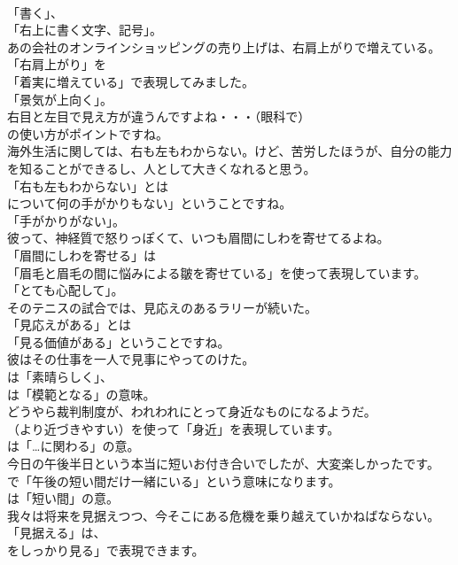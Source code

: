 \documentclass[8pt]{extreport}
\begin{document}
\begin{CJK}{UTF8}{min}
\\	「書く」、
\\	「右上に書く文字、記号」。	
\\	あの会社のオンラインショッピングの売り上げは、右肩上がりで増えている。 
\\	「右肩上がり」を
\\	「着実に増えている」で表現してみました。
\\	「景気が上向く」。	
\\	右目と左目で見え方が違うんですよね・・・（眼科で） 
\\	の使い方がポイントですね。	
\\	海外生活に関しては、右も左もわからない。けど、苦労したほうが、自分の能力を知ることができるし、人として大きくなれると思う。 
\\	「右も左もわからない」とは
\\	について何の手がかりもない」ということですね。
\\	「手がかりがない」。	
\\	彼って、神経質で怒りっぽくて、いつも眉間にしわを寄せてるよね。 
\\	「眉間にしわを寄せる」は
\\	「眉毛と眉毛の間に悩みによる皺を寄せている」を使って表現しています。
\\	「とても心配して」。	
\\	そのテニスの試合では、見応えのあるラリーが続いた。 
\\	「見応えがある」とは
\\	「見る価値がある」ということですね。	
\\	彼はその仕事を一人で見事にやってのけた。 
\\	は「素晴らしく」、
\\	は「模範となる」の意味。	
\\	どうやら裁判制度が、われわれにとって身近なものになるようだ。 
\\	（より近づきやすい）を使って「身近」を表現しています。
\\	は「…に関わる」の意。	
\\	今日の午後半日という本当に短いお付き合いでしたが、大変楽しかったです。 
\\	で「午後の短い間だけ一緒にいる」という意味になります。
\\	は「短い間」の意。	
\\	我々は将来を見据えつつ、今そこにある危機を乗り越えていかねばならない。 
\\	「見据える」は、
\\	をしっかり見る」で表現できます。

\end{CJK}
\end{document}
